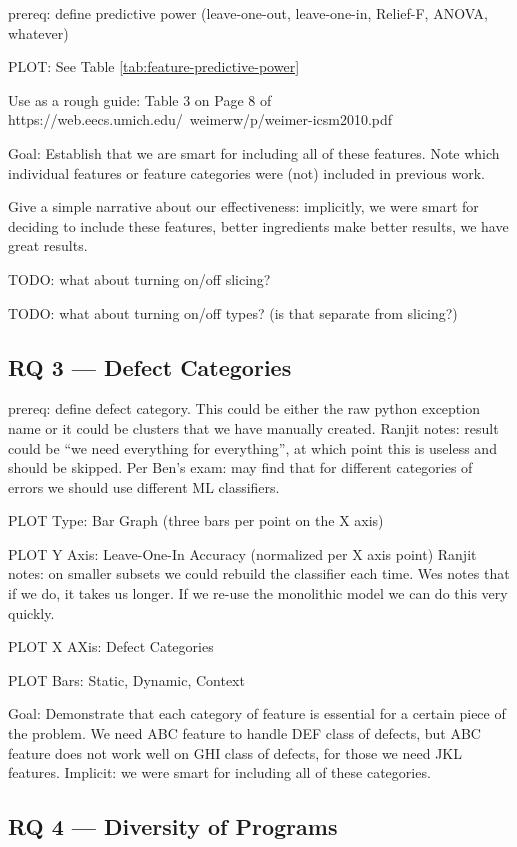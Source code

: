 \documentclass[conference]{IEEEtran}
\begin{document}
prereq: define predictive power (leave-one-out, leave-one-in, Relief-F,
ANOVA, whatever)

PLOT: See Table \ref{tab:feature-predictive-power}

Use as a rough guide: Table 3 on Page 8 of
https://web.eecs.umich.edu/~weimerw/p/weimer-icsm2010.pdf

Goal: Establish that we are smart for including all of these features. Note
which individual features or feature categories were (not) included in
previous work.

Give a simple narrative about our effectiveness: implicitly, we were smart
for deciding to include these features, better ingredients make better
results, we have great results.

TODO: what about turning on/off slicing?

TODO: what about turning on/off types? (is that separate from slicing?)

\subsection{RQ 3 --- Defect Categories}

prereq: define defect category. This could be either the raw python
exception name or it could be clusters that we have manually created.
Ranjit notes: result could be ``we need everything for everything'', at
which point this is useless and should be skipped. Per Ben's exam: may find
that for different categories of errors we should use different ML
classifiers.

PLOT Type: Bar Graph (three bars per point on the X axis)

PLOT Y Axis: Leave-One-In Accuracy (normalized per X axis point)
Ranjit notes: on smaller subsets we could rebuild the classifier each time.
Wes notes that if we do, it takes us longer. If we re-use the monolithic
model we can do this very quickly.

PLOT X AXis: Defect Categories

PLOT Bars: Static, Dynamic, Context

Goal: Demonstrate that each category of feature is essential for a certain
piece of the problem. We need ABC feature to handle DEF class of defects,
but ABC feature does not work well on GHI class of defects, for those we
need JKL features. Implicit: we were smart for including all of these
categories.

\subsection{RQ 4 --- Diversity of Programs}
\end{document}
